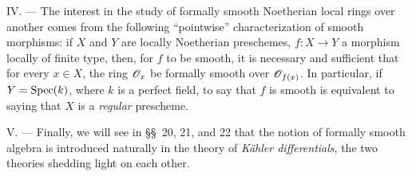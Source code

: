 \begin{env}[19.0.2]
\medskip\noindent IV. ---
The interest in the study of formally smooth Noetherian local rings over another comes from the following ``pointwise'' characterization of smooth morphisms:
if $X$ and $Y$ are locally Noetherian preschemes, $f:X\to Y$ a morphism locally of finite type, then, for $f$ to be smooth, it is necessary and sufficient that for every $x\in X$, the ring $\mathscr{O}_x$ be formally smooth over $\mathscr{O}_{f(x)}$.
In particular, if $Y=\operatorname{Spec}(k)$, where $k$ is a perfect field, to say that $f$ is smooth is equivalent to saying that $X$ is a \emph{regular} prescheme.

\medskip\noindent V. ---
Finally, we will see in \S\S~20, 21, and 22 that the notion of formally smooth algebra is introduced naturally in the theory of \emph{K\"ahler differentials}, the two theories shedding light on each other.
\end{env}

